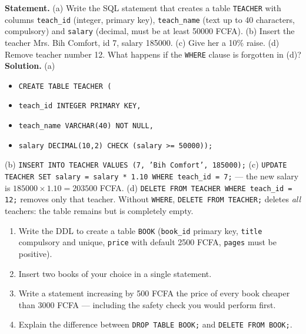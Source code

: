 \documentclass[11pt]{article}
\begin{document}
\begin{exoresolu}
\textbf{Statement.} (a) Write the SQL statement that creates a table \texttt{TEACHER} with columns \texttt{teach\_id} (integer, primary key), \texttt{teach\_name} (text up to 40 characters, compulsory) and \texttt{salary} (decimal, must be at least 50000 FCFA). (b) Insert the teacher Mrs. Bih Comfort, id 7, salary 185000. (c) Give her a 10\% raise. (d) Remove teacher number 12. What happens if the \texttt{WHERE} clause is forgotten in (d)?
\tcblower
\textbf{Solution.}
(a)
\begin{itemize}
\item[] \texttt{CREATE TABLE TEACHER (}
\item[] \texttt{\quad teach\_id   INTEGER PRIMARY KEY,}
\item[] \texttt{\quad teach\_name VARCHAR(40) NOT NULL,}
\item[] \texttt{\quad salary    DECIMAL(10,2) CHECK (salary >= 50000));}
\end{itemize}
(b) \texttt{INSERT INTO TEACHER VALUES (7, 'Bih Comfort', 185000);}
(c) \texttt{UPDATE TEACHER SET salary = salary * 1.10 WHERE teach\_id = 7;} — the new salary is $185000 \times 1.10 = 203500$ FCFA.
(d) \texttt{DELETE FROM TEACHER WHERE teach\_id = 12;} removes only that teacher. Without \texttt{WHERE}, \texttt{DELETE FROM TEACHER;} deletes \emph{all} teachers: the table remains but is completely empty.
\end{exoresolu}

\begin{exercice}
\begin{enumerate}
\item Write the DDL to create a table \texttt{BOOK} (\texttt{book\_id} primary key, \texttt{title} compulsory and unique, \texttt{price} with default 2500 FCFA, \texttt{pages} must be positive).
\item Insert two books of your choice in a single statement.
\item Write a statement increasing by 500 FCFA the price of every book cheaper than 3000 FCFA — including the safety check you would perform first.
\item Explain the difference between \texttt{DROP TABLE BOOK;} and \texttt{DELETE FROM BOOK;}.
\end{enumerate}
\end{exercice}
\end{document}
